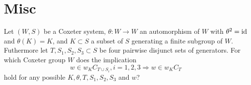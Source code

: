 \section{Misc}

\begin{ques}
\label{ques:main}
Let $(W,S)$ be a Coxeter system, $\theta : W \to W$ an automorphism of $W$ with
$\theta^2 = \operatorname{id}$ and $\theta(K) = K$, and $K \subset S$ a subset of $S$ generating
a finite subgroup of $W$. Futhermore let $T,S_1,S_2,S_3 \subset S$ be four pairwise
disjunct sets of generators. For which Coxeter group $W$ does the implication
\begin{equation}
\label{equ:main}
w \in w_K C_{T \cup S_i}, i=1,2,3 \Rightarrow w \in w_K C_T
\end{equation}
hold for any possible $K,\theta,T,S_1,S_2,S_3$ and $w$?
\end{ques}

